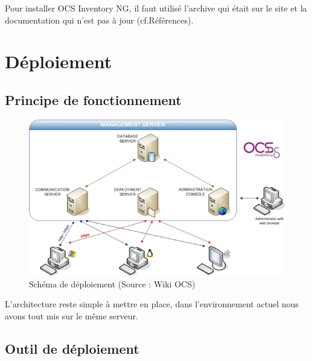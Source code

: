 \documentclass[11pt,a4paper,oneside]{article}
\begin{document}
Pour installer OCS Inventory NG, il faut utilisé l'archive qui était sur le site et la documentation qui n'est pas à jour (cf.Références).
\newpage
\section{Déploiement}
\subsection{Principe de fonctionnement}
\begin{figure}[hbtp]
\includegraphics[scale=0.8]{Script/deploy.jpg}
\caption{Schéma de déploiement (Source : Wiki OCS)}
\end{figure}
L'architecture reste simple à mettre en place, dans l'environnement actuel nous avons tout mis sur le même serveur.
\subsection{Outil de déploiement}
\end{document}
